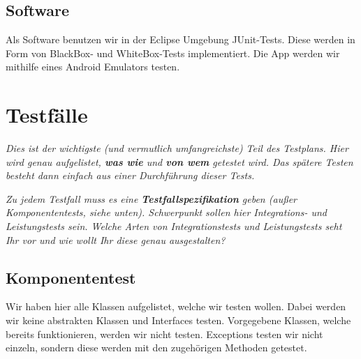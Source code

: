 \documentclass[fontsize=12pt,paper=a4,twoside]{scrartcl}
\begin{document}
{\subsection{Software}

Als Software benutzen wir in der Eclipse Umgebung JUnit-Tests. Diese werden in Form von BlackBox- und WhiteBox-Tests implementiert. Die App werden wir mithilfe eines Android Emulators testen.

\section{Testfälle}\label{c10}

{\em Dies ist der wichtigste (und vermutlich umfangreichste) Teil des
  Testplans. Hier wird genau aufgelistet, {\bf was wie} und {\bf von
  wem} getestet wird. Das spätere Testen besteht dann einfach aus
  einer Durchführung dieser Tests.}

{\em Zu jedem Testfall muss es eine {\bf Testfallspezifikation}
  geben (außer Komponententests, siehe unten). Schwerpunkt sollen
  hier Integrations- und Leistungstests sein. Welche Arten von
  Integrationstests und Leistungstests seht Ihr vor und wie wollt Ihr
  diese genau ausgestalten?}

\subsection{Komponententest}\label{c10-0}

Wir haben hier alle Klassen aufgelistet, welche wir testen wollen. Dabei werden wir keine abstrakten Klassen und Interfaces testen. Vorgegebene Klassen, welche bereits funktionieren, werden wir nicht testen. Exceptions testen wir nicht einzeln, sondern diese werden mit den zugehörigen Methoden getestet.

}
\end{document}
